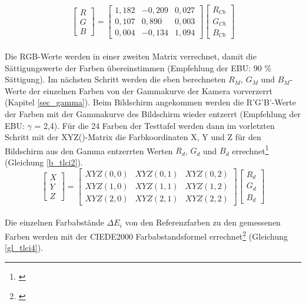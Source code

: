 \begin{equation}\label{gl_tlci1}
\begin{bmatrix} R \\ G \\ B \end{bmatrix}= 
\begin{bmatrix} 1,182 & -0,209 & 0,027 \\ 0,107 & 0,890 & 0,003 \\ 0,004 & -0,134 & 1,094 \end{bmatrix}
\begin{bmatrix} R_{Cb} \\ G_{Cb} \\ B_{Cb} \end{bmatrix}
\end{equation}\\
Die RGB-Werte werden in einer zweiten Matrix verrechnet, damit die Sättigungswerte der Farben übereinstimmen (Empfehlung der EBU: 90 \% Sättigung). Im nächsten Schritt werden die eben berechneten $R_{M}$, $G_{M}$ und $B_{M}$-Werte der einzelnen Farben von der Gammakurve der Kamera vorverzerrt (Kapitel \ref{sec_gamma}).
Beim Bildschirm angekommen werden die R'G'B'-Werte der Farben mit der Gammakurve des Bildschirm wieder entzerrt (Empfehlung der EBU: $\gamma$ = 2,4). Für die 24 Farben der Testtafel werden dann im vorletzten Schritt mit der XYZ()-Matrix die Farbkoordinaten X, Y und Z für den Bildschirm aus den Gamma entzerrten Werten  $R_{d}$, $G_{d}$ und $B_{d}$ errechnet\footnote{\cite[17]{roberts}} (Gleichung \ref{b_tlci2}).
\begin{equation}\label{gl_tlci2}
\begin{bmatrix} X \\ Y \\ Z \end{bmatrix}= 
\begin{bmatrix} XYZ(0,0) & XYZ(0,1) & XYZ(0,2) \\ XYZ(1,0) & XYZ(1,1) & XYZ(1,2) \\ XYZ(2,0) & XYZ(2,1) & XYZ(2,2) \end{bmatrix}
\begin{bmatrix} R_{d} \\ G_{d} \\ B_{d} \end{bmatrix}
\end{equation}\\
Die einzelnen Farbabstände $\Delta E_{i}$ von den Referenzfarben zu den gemessenen Farben werden mit der CIEDE2000 Farbabstandsformel errechnet\footnote{\cite[3]{sharwu}} (Gleichung \ref{gl_tlci4}).

